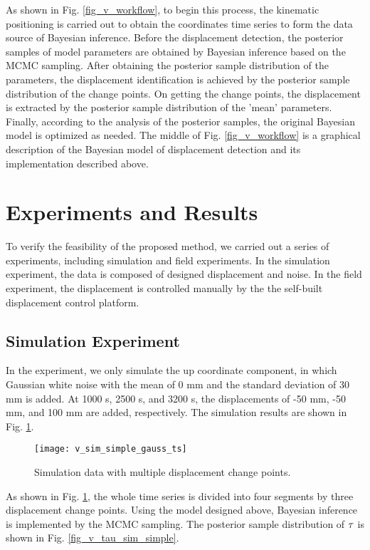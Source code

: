 \documentclass[journal]{IEEEtran}
\begin{document}
As shown in Fig. \ref{fig_v_workflow}, to begin this process, the kinematic positioning is carried out to obtain the coordinates time series to form the data source of Bayesian inference. 
Before the displacement detection,  the posterior samples of model parameters are obtained by Bayesian inference based on the MCMC sampling.
After obtaining the posterior sample distribution of the parameters, the displacement identification is achieved by the posterior sample distribution of the change points.
On getting the change points, the displacement is extracted by the posterior sample distribution of  the 'mean' parameters.
Finally, according to the analysis of the posterior samples, the original Bayesian model is optimized as needed.
The middle of Fig. \ref{fig_v_workflow} is a graphical description of the Bayesian model of displacement detection and its implementation described above.

\section{Experiments and Results}
\label{exp}
To verify the feasibility of the proposed method, we carried out a series of experiments, including simulation and field experiments. 
In the simulation experiment, the data is composed of designed displacement and noise.
In the field experiment, the displacement is controlled manually by the  the self-built displacement control platform.

\subsection{Simulation Experiment}
In the experiment, we only simulate the up coordinate component, in which Gaussian white noise with the mean of 0 mm and the standard deviation of 30 mm is added.
At 1000 s, 2500 s, and 3200 s, the displacements of -50 mm, -50 mm, and 100 mm are added, respectively. 
The simulation results are shown in Fig. \ref{fig_v_sim_simple_gauss_ts}.

\begin{figure}[htbp]
	\centering
	\texttt{[image: v\_sim\_simple\_gauss\_ts]}
	\caption{Simulation data with multiple displacement change points.}
	\label{fig_v_sim_simple_gauss_ts}
\end{figure} 
As shown in Fig. \ref{fig_v_sim_simple_gauss_ts}, the whole time series is divided into four segments by three displacement change points. 
Using the model designed above, Bayesian inference is implemented by the MCMC sampling. 
The posterior sample distribution of $\bf{\tau}$ is shown in Fig. \ref{fig_v_tau_sim_simple}.
\end{document}
